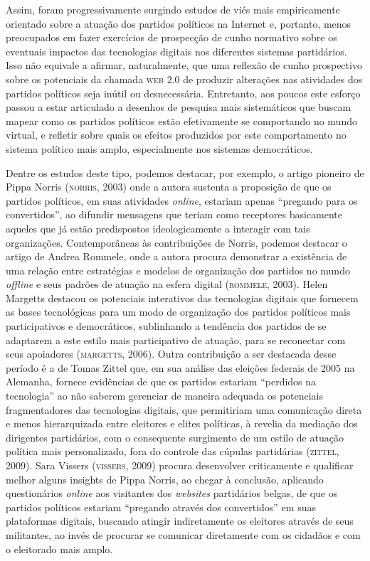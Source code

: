 Assim, foram progressivamente surgindo estudos de viés mais
empiricamente orientado sobre a atuação dos partidos políticos na
Internet e, portanto, menos preocupados em fazer exercícios de
prospecção de cunho normativo sobre os eventuais impactos das
tecnologias digitais nos diferentes sistemas partidários. Isso não
equivale a afirmar, naturalmente, que uma reflexão de cunho prospectivo
sobre os potenciais da chamada \textsc{web 2.0} de produzir alterações nas
atividades dos partidos políticos seja inútil ou desnecessária.
Entretanto, aos poucos este esforço passou a estar articulado a desenhos
de pesquisa mais sistemáticos que buscam mapear como os partidos
políticos estão efetivamente se comportando no mundo virtual, e refletir
sobre quais os efeitos produzidos por este comportamento no sistema
político mais amplo, especialmente nos sistemas democráticos.

Dentre os estudos deste tipo, podemos destacar, por exemplo, o artigo
pioneiro de Pippa Norris (\textsc{norris}, 2003) onde a autora sustenta a
proposição de que os partidos políticos, em suas atividades \textit{online},
estariam apenas ``pregando para os convertidos'', ao difundir mensagens
que teriam como receptores basicamente aqueles que já estão predispostos
ideologicamente a interagir com tais organizações. Contemporâneas às
contribuições de Norris, podemos destacar o artigo de Andrea Rommele,
onde a autora procura demonstrar a existência de uma relação entre
estratégias e modelos de organização dos partidos no mundo \textit{offline} e
seus padrões de atuação na esfera digital (\textsc{rommele}, 2003). Helen
Margetts destacou os potenciais interativos das tecnologias digitais que
fornecem as bases tecnológicas para um modo de organização dos partidos
políticos mais participativos e democráticos, sublinhando a tendência
dos partidos de se adaptarem a este estilo mais participativo de
atuação, para se reconectar com seus apoiadores (\textsc{margetts}, 2006). Outra
contribuição a ser destacada desse período é a de Tomas Zittel que, em
sua análise das eleições federais de 2005 na Alemanha, fornece
evidências de que os partidos estariam ``perdidos na tecnologia'' ao não
saberem gerenciar de maneira adequada os potenciais fragmentadores das
tecnologias digitais, que permitiriam uma comunicação direta e menos
hierarquizada entre eleitores e elites políticas, à revelia da mediação
dos dirigentes partidários, com o consequente surgimento de um estilo de
atuação política mais personalizado, fora do controle das cúpulas
partidárias (\textsc{zittel}, 2009). Sara Vissers (\textsc{vissers}, 2009) procura
desenvolver criticamente e qualificar melhor alguns insights de Pippa
Norris, ao chegar à conclusão, aplicando questionários \textit{online} aos
visitantes dos \textit{websites} partidários belgas, de que os partidos políticos
estariam ``pregando através dos convertidos'' em suas plataformas
digitais, buscando atingir indiretamente os eleitores através de seus
militantes, ao invés de procurar se comunicar diretamente com os
cidadãos e com o eleitorado mais amplo.

